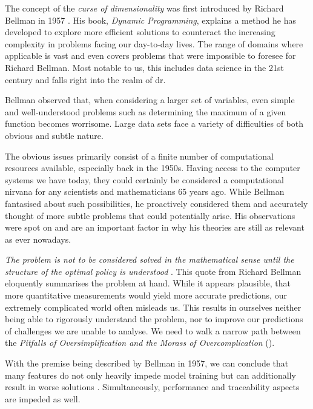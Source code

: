 The concept of the \emph{curse of dimensionality} was first introduced by Richard Bellman in 1957 \cite{DynProg}.
His book, \emph{Dynamic Programming}, explains a method he has developed to explore more efficient solutions to counteract the increasing complexity in problems facing our day-to-day lives. 
The range of domains where applicable is vast and even covers problems that were impossible to foresee for Richard Bellman.
Most notable to us, this includes data science in the 21st century and falls right into the realm of \acrlong{dr}.
\bigskip

Bellman observed that, when considering a larger set of variables, even simple and well-understood problems such as determining the maximum of a given function becomes worrisome.
Large data sets face a variety of difficulties of both obvious and subtle nature.

The obvious issues primarily consist of a finite number of computational resources available, especially back in the 1950s. 
Having access to the computer systems we have today, they could certainly be considered a computational nirvana for any scientists and mathematicians 65 years ago.
While Bellman fantasised about such possibilities, he proactively considered them and accurately thought of more subtle problems that could potentially arise.
His observations were spot on and are an important factor in why his theories are still as relevant as ever nowadays.

\emph{The problem is not to be considered solved in the mathematical sense until the structure of the optimal policy is understood} \cite{DynProg}.
This quote from Richard Bellman eloquently summarises the problem at hand.  
While it appears plausible, that more quantitative measurements would yield more accurate predictions, our extremely complicated world often misleads us.
This results in ourselves neither being able to rigorously understand the problem, nor to improve our predictions of challenges we are unable to analyse.
We need to walk a narrow path between the \emph{Pitfalls of Oversimplification and the Morass of Overcomplication} ().
\bigskip

With the premise being described by Bellman in 1957, we can conclude that many features do not only heavily impede model training but can additionally result in worse solutions \cite{HandsOnMLCh8}.
Simultaneously, performance and traceability aspects are impeded as well.
